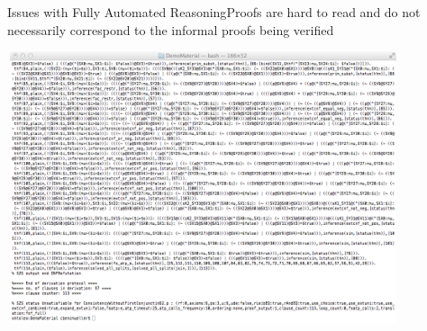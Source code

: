 





\begin{frame}{Issues with Fully Automated Reasoning}{Proofs are hard to read and do not necessarily correspond to the informal proofs being verified}
\begin{changemargin}{-.5cm}{-1cm}
\colorbox{gray!20}{
\includegraphics[width=11.5cm,height=8cm]{./Images/LeoProof.png}
}
\end{changemargin}
\end{frame}


